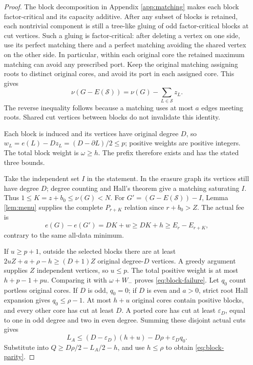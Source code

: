 \documentclass[11pt,a4paper]{article}
\theoremstyle{definition}
\begin{document}
\begin{proof}
The block decomposition in Appendix \ref{app:matching} makes each block factor-critical and its capacity additive.
After any subset of blocks is retained, each nontrivial component is still a tree-like gluing of odd factor-critical blocks at cut vertices. Such a gluing is factor-critical: after deleting a vertex on one side, use its perfect matching there and a perfect matching avoiding the shared vertex on the other side. In particular, within each original core the retained maximum matching can avoid any prescribed port.
Keep the original matching assigning roots to distinct original cores, and avoid its port in each assigned core. This gives
\[
 \nu(G-E(\mathcal S))=\nu(G)-\sum_{L\in\mathcal S}z_L.
\]
The reverse inequality follows because a matching uses at most $a$ edges meeting roots. Shared cut vertices between blocks do not invalidate this identity.

Each block is induced and its vertices have original degree $D$, so
$w_L=e(L)-Dz_L=(D-\partial L)/2\le p$; positive weights are positive integers.
The total block weight is $\omega\ge h$. The prefix therefore exists and has the stated three bounds.

Take the independent set $I$ in the statement. In the erasure graph its vertices still have degree $D$; degree counting and Hall's theorem give a matching saturating $I$. Thus
$1\le K=z+b_0\le\nu(G)<N$.
For $G'=(G-E(\mathcal S))-I$, Lemma \ref{lem:menu} supplies the complete $P_{r+K}$ relation since $r+b_0>Z$. The actual fee is
\[
 e(G)-e(G')=DK+w\ge DK+h\ge E_r-E_{r+K},
\]
contrary to the same all-data minimum.

If $u\ge p+1$, outside the selected blocks there are at least
$2uZ+a+\rho-h\ge(D+1)Z$ original degree-$D$ vertices. A greedy argument supplies $Z$ independent vertices, so $u\le p$.
The total positive weight is at most $h+p-1+pu$. Comparing it with $\omega+W_-$ proves \eqref{eq:block-failure}.
Let $q_0$ count portless original cores. If $D$ is odd, $q_0=0$; if $D$ is even and $a>0$, strict root Hall expansion gives $q_0\le\rho-1$.
At most $h+u$ original cores contain positive blocks, and every other core has cut at least $D$. A ported core has cut at least $\varepsilon_D$, equal to one in odd degree and two in even degree. Summing these disjoint actual cuts gives
\[
 L_A\le(D-\varepsilon_D)(h+u)-D\rho+\varepsilon_Dq_0.
\]
Substitute into $Q\ge D\rho/2-L_A/2-h$, and use $h\le\rho$ to obtain \eqref{eq:block-parity}.
\end{proof}
\end{document}

